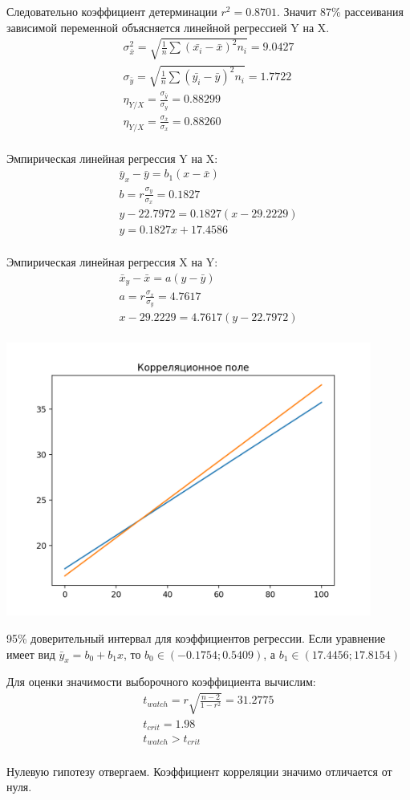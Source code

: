 Следовательно коэффициент детерминации $r^2 = 0.8701$.
Значит 87\% рассеивания зависимой переменной объясняется линейной регрессией Y на X\@.
\begin{gather*}
    \sigma_{\bar{x}}^2 = \sqrt{\frac{1}{n}\sum (\bar{x_i} - \bar{x})^2 n_i} = 9.0427\\
    \sigma_{\bar{y}} = \sqrt{\frac{1}{n}\sum (\bar{y_i} - \bar{y})^2 n_i} = 1.7722\\
    \eta_{Y/X} = \frac{\sigma_{\bar{y}}}{\sigma_y} = 0.88299\\
    \eta_{Y/X} = \frac{\sigma_{\bar{x}}}{\sigma_x} = 0.88260\\
\end{gather*}

Эмпирическая линейная регрессия Y на X:
\begin{gather*}
    \bar{y}_x - \bar{y} = b_1(x - \bar{x})\\
    b = r \frac{\sigma_y}{\sigma_x} = 0.1827\\
    y - 22.7972 = 0.1827(x - 29.2229)\\
    y = 0.1827x + 17.4586\\
\end{gather*}

Эмпирическая линейная регрессия X на Y:
\begin{gather*}
    \bar{x}_y - \bar{x} = a(y - \bar{y})\\
    a = r \frac{\sigma_x}{\sigma_y} = 4.7617\\
    x - 29.2229 = 4.7617(y - 22.7972)\\
\end{gather*}

\includegraphics[width=0.9\textwidth]{src/gr31}

95\% доверительный интервал для коэффициентов регрессии.
Если уравнение имеет вид $\bar{y}_x = b_0 + b_1 x$, то $b_0 \in (-0.1754; 0.5409)$, а $b_1 \in (17.4456; 17.8154)$

Для оценки значимости выборочного коэффициента вычислим:
\begin{gather*}
    t_{watch} = r\sqrt{\frac{n-2}{1-r^2}} = 31.2775\\
    t_{crit} = 1.98\\
    t_{watch} > t_{crit}\\
\end{gather*}

Нулевую гипотезу отвергаем.
Коэффициент корреляции значимо отличается от нуля.